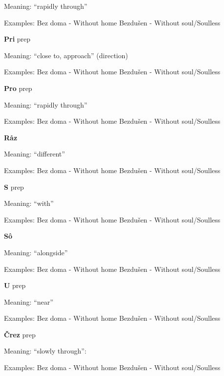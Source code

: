 Meaning: “rapidly through”

Examples:
Bez doma - Without home
Bezdušen - Without soul/Soulless 


\textbf{Pri} \gls{prep}

Meaning: “close to, approach” (direction)

Examples:
Bez doma - Without home
Bezdušen - Without soul/Soulless 

\textbf{Pro} \gls{prep}

Meaning: “rapidly through”

Examples:
Bez doma - Without home
Bezdušen - Without soul/Soulless 

\textbf{Råz}

Meaning: “different”

Examples:
Bez doma - Without home
Bezdušen - Without soul/Soulless 

\textbf{S} \gls{prep}

Meaning: “with”

Examples:
Bez doma - Without home
Bezdušen - Without soul/Soulless 

\textbf{Sô}

Meaning: “alongside”

Examples:
Bez doma - Without home
Bezdušen - Without soul/Soulless 

\textbf{U} \gls{prep}

Meaning: “near”

Examples:
Bez doma - Without home
Bezdušen - Without soul/Soulless 

\textbf{Črez} \gls{prep}

Meaning: “slowly through”:

Examples:
Bez doma - Without home
Bezdušen - Without soul/Soulless 

